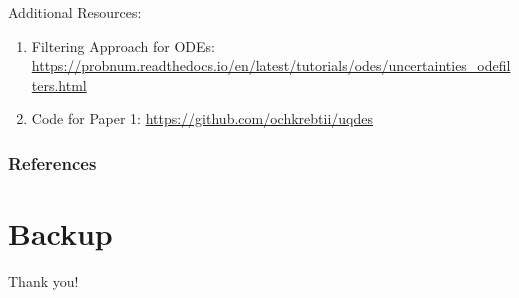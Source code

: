 \documentclass[usenames,dvipsnames]{beamer}
\theoremstyle{definition}
\begin{document}
\begin{frame}{Additional Resources:}
\begin{enumerate}
    \item Filtering Approach for ODEs: \url{https://probnum.readthedocs.io/en/latest/tutorials/odes/uncertainties_odefilters.html}
    
    \item Code for Paper 1: \url{https://github.com/ochkrebtii/uqdes}
\end{enumerate}
\end{frame}


\begin{frame}[allowframebreaks]
    \frametitle{References}
    

    
\end{frame}

\section{Backup}
\begin{frame}{}
\begin{center}
    \Large{Thank you!}
\end{center}
        
\end{frame}


\end{document}
